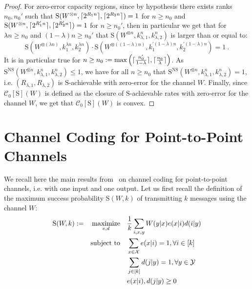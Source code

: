 \begin{proof}
For zero-error capacity regions, since by hypothesis there exists ranks $n_0,n_0'$ such that $\mathrm{S}(W^{\otimes n},\lceil2^{R_1n}\rceil,\lceil2^{R_2n}\rceil) = 1$ for $n \geq n_0$ and $\mathrm{S}(W^{\otimes n},\lceil2^{R_1'n}\rceil,\lceil2^{R_2'n}\rceil) = 1$ for $n \geq n_0'$, then in particular we get that for $\lambda n \geq n_0$ and $(1-\lambda) n \geq n_0'$ that $\mathrm{S}(W^{\otimes n},k^n_{\lambda,1},k^n_{\lambda, 2})$ is larger than or equal to:
\[ \mathrm{S}(W^{\otimes (\lambda n)}, k_1^{\lambda n}, k_2^{\lambda n}) \cdot \mathrm{S}(W^{\otimes ((1-\lambda) n)}, k_1^{\prime (1-\lambda) n}, k_2^{\prime (1-\lambda) n}) = 1 \ .\]
It is in particular true for $n \geq n_0 := \max\left(\lceil\frac{n_0'}{1-\lambda}\rceil,\lceil\frac{n_0}{\lambda}\rceil\right)$. As $\mathrm{S}^{\mathrm{NS}}(W^{\otimes n},k^n_{\lambda,1},k^n_{\lambda,2}) \leq 1$, we have  for all $n \geq n_0$ that $\mathrm{S}^{\mathrm{NS}}(W^{\otimes n},k^n_{\lambda,1},k^n_{\lambda,2}) = 1$, i.e. $(R_{\lambda,1},R_{\lambda,2})$ is $\mathrm{S}$-achievable with zero-error for the channel $W$.  Finally, since $\mathcal{C}_0[\mathrm{S}](W)$ is defined as the closure of $\mathrm{S}$-achievable rates with zero-error for the channel $W$, we get that $\mathcal{C}_0[\mathrm{S}](W)$ is convex.
\end{proof}
 
\section{Channel Coding for Point-to-Point Channels}
\label{subsection:onewaychannelcoding} 
We recall here the main results from~\cite{BF18} on channel coding for point-to-point channels, i.e. with one input and one output. Let us first recall the definition of the maximum success probability $\mathrm{S}(W,k)$ of transmitting $k$ messages using the channel $W$:
\begin{equation}
  \begin{aligned}
    \mathrm{S}(W,k) := &&\underset{e,d}{\operatorname{\text{maximize}}} &&& \frac{1}{k} \sum_{i,x,y} W(y|x)e(x|i)d(i|y)\\
    &&\operatorname{\text{subject to}} &&& \sum_{x \in \mathcal{X}} e(x|i) = 1, \forall i \in [k]\\
    &&&&& \sum_{j \in [k]} d(j|y) = 1, \forall y \in \mathcal{Y}\\
    &&&&& e(x|i), d(j|y) \geq 0
  \end{aligned}
\end{equation}

